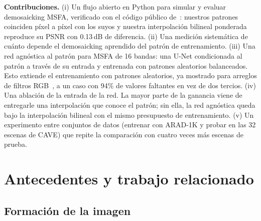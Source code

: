 \documentclass{article}
\begin{document}
\textbf{Contribuciones.} (i) Un flujo abierto en Python para simular y
evaluar demosaicking MSFA, verificado con el código público
de~\cite{diaz2023}: nuestros patrones coinciden píxel a píxel con los suyos
y nuestra interpolación bilineal ponderada reproduce su PSNR con 0.13\,dB de
diferencia. (ii) Una medición sistemática de cuánto depende el demosaicking
aprendido del patrón de entrenamiento. (iii) Una red agnóstica al patrón
para MSFA de 16 bandas: una U-Net condicionada al patrón a través de su
entrada y entrenada con patrones aleatorios balanceados. Esto extiende el
entrenamiento con patrones aleatorios, ya mostrado para arreglos de filtros
RGB~\cite{bourrier2022}, a un caso con 94\% de valores faltantes en vez de
dos tercios. (iv) Una ablación de la entrada de la red. La mayor parte de la
ganancia viene de entregarle una interpolación que conoce el patrón; sin
ella, la red agnóstica queda bajo la interpolación bilineal con el mismo
presupuesto de entrenamiento. (v) Un experimento entre conjuntos de datos
(entrenar con ARAD-1K y probar en las 32 escenas de CAVE) que repite la
comparación con cuatro veces más escenas de prueba.

\section{Antecedentes y trabajo relacionado}
\label{sec:background}

\subsection{Formación de la imagen}
\end{document}
